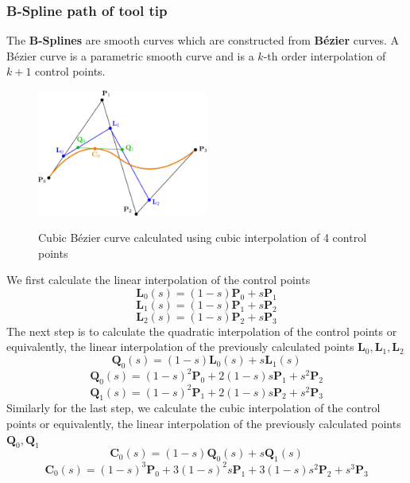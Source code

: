 \subsubsection{B-Spline path of tool tip}

The \textbf{B-Splines} are smooth curves which are constructed from \textbf{B\'ezier} curves. A B\'ezier curve is a parametric smooth curve and is a $k$-th order interpolation of $k+1$ control points.

\begin{center}
\begin{figure}[H]
\centering
\includegraphics[width=0.5\textwidth]{images/bezier-curve.png}\\
\caption{Cubic B\'ezier curve calculated using cubic interpolation of 4 control points} 
\end{figure}
\end{center}

We first calculate the linear interpolation of the control points
\begin{equation}
\mathbf{L}_0(s) = (1-s)\mathbf{P}_0 + s\mathbf{P}_1
\end{equation}
\[
\mathbf{L}_1(s) = (1-s)\mathbf{P}_1 + s\mathbf{P}_2
\]
\[
\mathbf{L}_2(s) = (1-s)\mathbf{P}_2 + s\mathbf{P}_3
\]
The next step is to calculate the quadratic interpolation of the control points or equivalently, the linear interpolation of the previously calculated points $\mathbf{L}_0,\mathbf{L}_1,\mathbf{L}_2$
\[
\mathbf{Q}_0(s) = (1-s)\mathbf{L}_0(s) + s\mathbf{L}_1(s)
\]
\begin{equation}
\mathbf{Q}_0(s) = (1-s)^2\mathbf{P}_0 + 2(1-s)s\mathbf{P}_1 + s^2\mathbf{P}_2
\end{equation}
\[
\mathbf{Q}_1(s) = (1-s)^2\mathbf{P}_1 + 2(1-s)s\mathbf{P}_2 + s^2\mathbf{P}_3
\]
Similarly for the last step, we calculate the cubic interpolation of the control points or equivalently, the linear interpolation of the previously calculated points $\mathbf{Q}_0,\mathbf{Q}_1$
\[
\mathbf{C}_0(s) = (1-s)\mathbf{Q}_0(s) + s\mathbf{Q}_1(s)
\]
\begin{equation}
\mathbf{C}_0(s) = (1-s)^3\mathbf{P}_0 +3(1-s)^2 s\mathbf{P}_1 + 3(1-s)s^2\mathbf{P}_2 + s^3\mathbf{P}_3
\end{equation}

